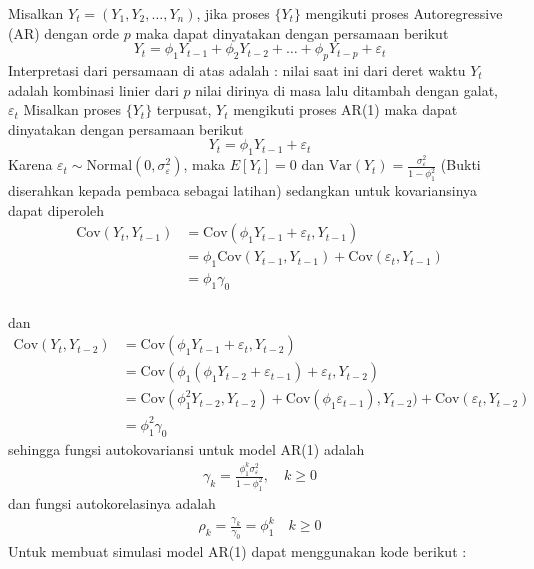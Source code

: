 \documentclass[
]{book}
\begin{document}
Misalkan \(Y_t=(Y_1,Y_2,…,Y_n )\), jika proses \(\{Y_t\}\) mengikuti proses Autoregressive (AR) dengan orde \(p\) maka dapat dinyatakan dengan persamaan berikut
\begin{equation}
Y_t=\phi_1 Y_{t-1}+\phi_2 Y_{t-2}+\dots+\phi_p Y_{t-p}+\varepsilon_t
\end{equation}
Interpretasi dari persamaan di atas adalah : nilai saat ini dari deret waktu \(Y_t\) adalah kombinasi linier dari \(p\) nilai dirinya di masa lalu ditambah dengan galat, \(\varepsilon_t\)
Misalkan proses \(\{Y_t\}\) terpusat, \(Y_t\) mengikuti proses AR(1) maka dapat dinyatakan dengan persamaan berikut
\begin{equation}
Y_t=\phi_1 Y_{t-1}+\varepsilon_t
\end{equation}
Karena \(\varepsilon_t\sim \text{Normal}(0,\sigma^2_\varepsilon)\), maka \(E[Y_t]= 0\) dan \(\text{Var}(Y_t)=\frac{\sigma_\varepsilon^2}{1-\phi_1^2}\) (Bukti diserahkan kepada pembaca sebagai latihan)
sedangkan untuk kovariansinya dapat diperoleh
\begin{align*}
\text{Cov}(Y_t,Y_{t-1}) &=\text{Cov}(\phi_1 Y_{t-1}+\varepsilon_t,Y_{t-1} ) \\
&=\phi_1 \text{Cov}(Y_{t-1},Y_{t-1})+\text{Cov}(\varepsilon_{t},Y_{t-1} ) \\
&=\phi_1 \gamma_0
\end{align*}\\
dan
\begin{align*}
\text{Cov}(Y_t,Y_{t-2})&=\text{Cov}(\phi_1  Y_{t-1}+\varepsilon_t, Y_{t-2}) \\ 
&= \text{Cov}(\phi_1  (\phi_1Y_{t-2}+\varepsilon_{t-1})+\varepsilon_t, Y_{t-2}) \\ 
&= \text{Cov}(\phi_1^2 Y_{t-2},Y_{t-2}) + \text{Cov}(\phi_1\varepsilon_{t-1}),Y_{t-2}) + \text{Cov}(\varepsilon_t,Y_{t-2}) \\
&=\phi_1^2\gamma_0
\end{align*}
sehingga fungsi autokovariansi untuk model AR(1) adalah
\begin{align*}
\gamma_k = \frac{\phi_1^k \sigma_\varepsilon^2}{1-\phi_1^2}, \quad k \geq 0 
\end{align*}
dan fungsi autokorelasinya adalah
\begin{align*}
\rho_k = \frac{\gamma_k}{\gamma_0} = \phi_1^k \quad k \geq 0
\end{align*}
Untuk membuat simulasi model AR(1) dapat menggunakan kode berikut :
\end{document}
